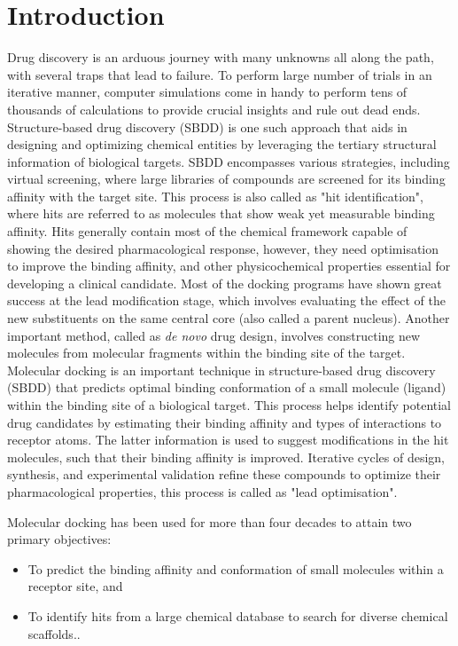\documentclass[10pt,letterpaper]{article}
\begin{document}
\section*{Introduction}
{
Drug discovery\cite{bib32} is an arduous journey with many unknowns all along the path, with several traps that lead to failure. To perform large number of trials in an iterative manner, computer simulations\cite{bib33, bib34} come in handy to perform tens of thousands of calculations to provide crucial insights and rule out dead ends. Structure-based drug discovery (SBDD) is one such approach that aids in designing and optimizing chemical entities by leveraging the tertiary structural information of biological targets. SBDD encompasses various strategies, including virtual screening, where large libraries of compounds are screened for its binding affinity with the target site. This process is also called as "hit identification", where hits are referred to as molecules that show weak yet measurable binding affinity. Hits generally contain most of the chemical framework capable of showing the desired pharmacological response, however, they need optimisation to improve the binding affinity, and other physicochemical properties essential for developing a clinical candidate. Most of the docking programs have shown great success at the lead modification stage, which involves evaluating the effect of the new substituents on the same central core (also called a parent nucleus)\cite{bib53}. 
Another important method, called as \textit{de novo} drug design, involves constructing new molecules from molecular fragments within the binding site of the target.  Molecular docking\cite{bib35} is an important technique in structure-based drug discovery (SBDD) that predicts optimal binding conformation of a small molecule (ligand) within the binding site of a biological target. This process helps identify potential drug candidates by estimating their binding affinity and types of interactions to receptor atoms. The latter information is used to suggest modifications in the hit molecules, such that their binding affinity is improved. Iterative cycles of design, synthesis, and experimental validation refine these compounds to optimize their pharmacological properties, this process is called as "lead optimisation". 


Molecular docking has been used for more than four decades to attain two primary objectives:
\begin{itemize}
    \item To predict the binding affinity and conformation of small molecules within a receptor site, and 
    \item To identify hits from a large chemical database to search for diverse chemical scaffolds.\cite{bib1}. 
\end{itemize}

}
\end{document}
